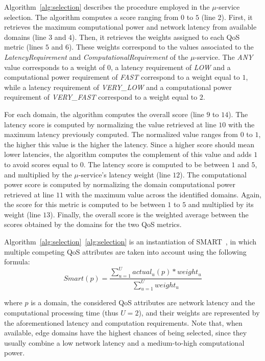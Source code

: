 Algorithm~\ref{alg:selection} describes the procedure employed in the $\mu$-service selection. The algorithm computes a score ranging from $0$ to $5$ (line $2$). First, it retrieves the maximum computational power and network latency from available domains (line $3$ and $4$). Then, it retrieves the weights assigned to each QoS metric (lines $5$ and $6$). These weights correspond to the values associated to the \textit{LatencyRequirement} and \textit{ComputationalRequirement} of the $\mu$-service. The \textit{ANY} value corresponds to a weight of $0$, a latency requirement of \textit{LOW} and a computational power requirement of \textit{FAST} correspond to a weight equal to $1$, while a latency requirement of \textit{VERY\_LOW} and a computational power requirement of \textit{VERY\_FAST} correspond to a weight equal to $2$. 

For each domain, the algorithm computes the overall score (line $9$ to $14$). The latency score is computed by normalizing the value retrieved at line $10$ with the maximum latency previously computed. The normalized value ranges from $0$ to $1$, the higher this value is the higher the latency. Since a higher score should mean lower latencies, the algorithm computes the complement of this value and adds $1$ to avoid scores equal to $0$. The latency score is computed to be between $1$ and $5$, and multiplied by the $\mu$-service's latency weight (line $12$). The computational power score is computed by normalizing the domain computational power retrieved at line $11$ with the maximum value across the identified domains. Again, the score for this metric is computed to be between $1$ to $5$ and multiplied by its weight (line $13$). Finally, the overall score is the weighted average between the scores obtained by the domains for the two QoS metrics.

Algorithm~\ref{alg:selection}~\ref{alg:selection} is an instantiation of SMART~\cite{Olson1996}, in which multiple competing QoS attributes are taken into account using the following formula:
{\small
\begin{equation}
Smart(p) = \frac{\sum_{u=1}^{U} actual_{u}(p)*weight_u}{\sum_{u=1}^{U}weight_u} \label{eq:smart}
\end{equation}
}%

\noindent
where $p$ is a domain, the considered QoS attributes are network latency and the computational processing time (thus $U = 2$), and their weights are represented by the aforementioned latency and computation requirements. Note that, when available, edge domains have the highest chances of being selected, since they usually combine a low network latency and a medium-to-high computational power. 

